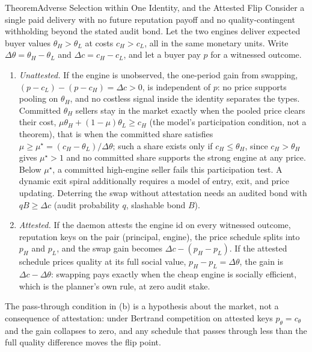 \documentclass[11pt,a4paper]{article}
\theoremstyle{definition}
\begin{document}
\begin{pdclaim}{Theorem}{Adverse Selection within One Identity, and the Attested Flip}
\setlength{\parskip}{4pt plus 1pt}
\label{thm:engine-swap}
Consider a single paid delivery with no future reputation payoff and no
quality-contingent withholding beyond the stated audit bond. Let the two
engines deliver expected buyer values $\theta_H>\theta_L$ at costs
$c_H>c_L$, all in the same monetary units. Write
$\Delta\theta=\theta_H-\theta_L$ and $\Delta c=c_H-c_L$, and let a buyer pay
$p$ for a witnessed outcome.
\begin{enumerate}[label=(\alph*),leftmargin=2em,itemsep=2pt]
\item \emph{Unattested.} If the engine is unobserved, the one-period gain
from swapping, $(p-c_L)-(p-c_H)=\Delta c>0$, is independent of $p$: no price
supports pooling on $\theta_H$, and no costless signal inside the identity
separates the types. Committed $\theta_H$ sellers stay in the market exactly
when the pooled price clears their cost, $\mu\theta_H+(1-\mu)\theta_L\ge c_H$
(the model's participation condition, not a theorem), that is when the
committed share satisfies $\mu\ge\mu^\star=(c_H-\theta_L)/\Delta\theta$; such a
share exists only if $c_H\le\theta_H$, since $c_H>\theta_H$ gives $\mu^\star>1$
and no committed share supports the strong engine at any price. Below $\mu^\star$, a committed high-engine seller fails this participation
test. A dynamic exit spiral additionally requires a model of entry, exit,
and price updating. Deterring the swap without
attestation needs an audited bond with $qB\ge\Delta c$ (audit probability
$q$, slashable bond $B$).
\item \emph{Attested.} If the daemon attests the engine id on every witnessed
outcome, reputation keys on the pair (principal, engine), the price schedule
splits into $p_H$ and $p_L$, and the swap gain becomes $\Delta c-(p_H-p_L)$.
If the attested schedule prices quality at its full social value,
$p_H-p_L=\Delta\theta$, the gain is $\Delta c-\Delta\theta$: swapping pays
exactly when the cheap engine is socially efficient, which is the planner's
own rule, at zero audit stake.


\end{enumerate}
The pass-through condition in (b) is a hypothesis about the market, not a
consequence of attestation: under Bertrand competition on attested keys
$p_\theta=c_\theta$ and the gain collapses to zero, and any schedule that
passes through less than the full quality difference moves the flip point.
\end{pdclaim}
\end{document}
